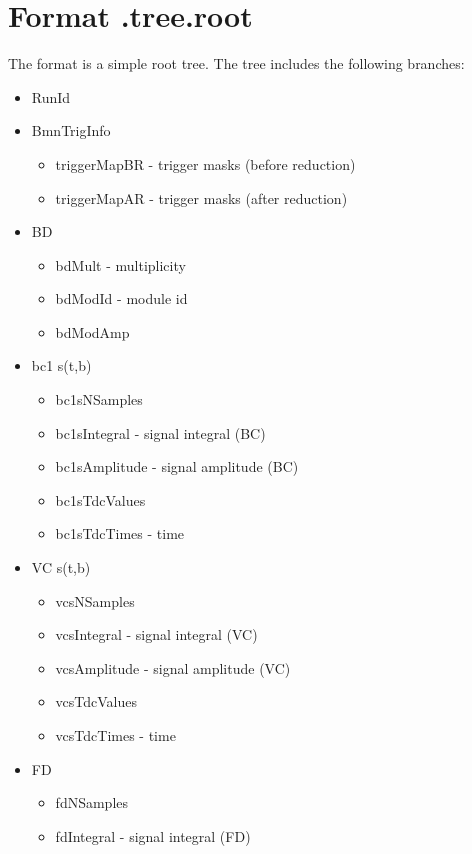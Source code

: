 \section{Format .tree.root}

The format is a simple root tree. The tree includes the following branches:
\begin{itemize}
    \item RunId
    \item BmnTrigInfo
        \begin{itemize}
            \item triggerMapBR - trigger masks (before reduction)
            \item triggerMapAR - trigger masks (after reduction)
        \end{itemize}
    \item BD
        \begin{itemize}
            \item bdMult - multiplicity
            \item bdModId - module id
            \item bdModAmp
        \end{itemize}
    \item bc1 s(t,b)
        \begin{itemize}
            \item bc1sNSamples
            \item bc1sIntegral - signal integral (BC)
            \item bc1sAmplitude - signal amplitude (BC)
            \item bc1sTdcValues
            \item bc1sTdcTimes - time
        \end{itemize}
    \item VC s(t,b)
        \begin{itemize}
            \item vcsNSamples
            \item vcsIntegral - signal integral (VC)
            \item vcsAmplitude - signal amplitude (VC)
            \item vcsTdcValues
            \item vcsTdcTimes - time
        \end{itemize}
    \item FD
        \begin{itemize}
            \item fdNSamples
            \item fdIntegral - signal integral (FD)

\end{itemize}
\end{itemize}
